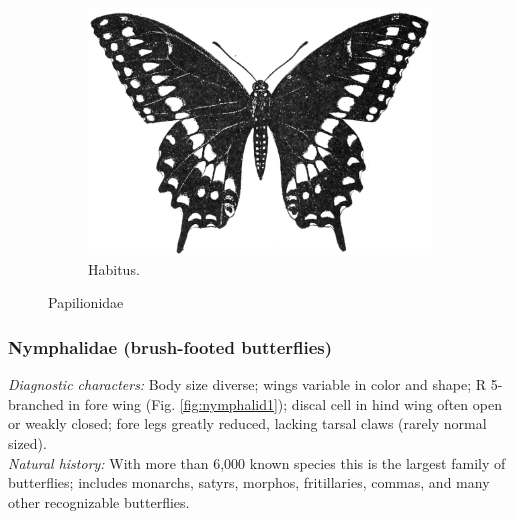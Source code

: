 \documentclass[letterpaper, 11pt]{article}
\begin{document}
\begin{figure}[ht!]
\begin{subfigure}[ht!]{0.6\textwidth}
        \includegraphics[width=\textwidth]{papilionid.png}
        \caption{Habitus. \citep[modified from][Fig. 317]{bhlitem38199}}
        \label{fig:papilionid2}
    \end{subfigure}
    \caption{Papilionidae}\label{fig:papilionids}
\end{figure}

\subsubsection{Nymphalidae (brush-footed butterflies)}
\noindent{}\textit{Diagnostic characters:} Body size diverse; wings variable in color and shape; R 5-branched in fore wing (Fig. \ref{fig:nymphalid1}); discal cell in hind wing often open or weakly closed; fore legs greatly reduced, lacking tarsal claws (rarely normal sized).\\

\noindent{}\textit{Natural history:} With more than 6,000 known species this is the largest family of butterflies; includes monarchs, satyrs, morphos, fritillaries, commas, and many other recognizable butterflies.
\end{document}
